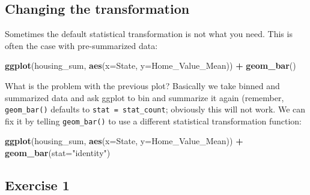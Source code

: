 \documentclass[]{book}
\newenvironment{Shaded}{\begin{snugshade}}{\end{snugshade}}
\newcommand{\KeywordTok}[1]{\textcolor[rgb]{0.13,0.29,0.53}{\textbf{#1}}}
\newcommand{\DataTypeTok}[1]{\textcolor[rgb]{0.13,0.29,0.53}{#1}}
\newcommand{\StringTok}[1]{\textcolor[rgb]{0.31,0.60,0.02}{#1}}
\newcommand{\OperatorTok}[1]{\textcolor[rgb]{0.81,0.36,0.00}{\textbf{#1}}}
\newcommand{\NormalTok}[1]{#1}
\begin{document}
\subsection{Changing the
transformation}\label{changing-the-transformation}

Sometimes the default statistical transformation is not what you need.
This is often the case with pre-summarized data:

\begin{Shaded}
\end{Shaded}

\begin{Shaded}
\begin{Highlighting}[]
\KeywordTok{ggplot}\NormalTok{(housing_sum, }\KeywordTok{aes}\NormalTok{(}\DataTypeTok{x=}\NormalTok{State, }\DataTypeTok{y=}\NormalTok{Home_Value_Mean)) }\OperatorTok{+}\StringTok{ }
\StringTok{  }\KeywordTok{geom_bar}\NormalTok{()}
\end{Highlighting}
\end{Shaded}

What is the problem with the previous plot? Basically we take binned and
summarized data and ask ggplot to bin and summarize it again (remember,
\texttt{geom\_bar()} defaults to \texttt{stat\ =\ stat\_count};
obviously this will not work. We can fix it by telling
\texttt{geom\_bar()} to use a different statistical transformation
function:

\begin{Shaded}
\begin{Highlighting}[]
\KeywordTok{ggplot}\NormalTok{(housing_sum, }\KeywordTok{aes}\NormalTok{(}\DataTypeTok{x=}\NormalTok{State, }\DataTypeTok{y=}\NormalTok{Home_Value_Mean)) }\OperatorTok{+}\StringTok{ }
\StringTok{  }\KeywordTok{geom_bar}\NormalTok{(}\DataTypeTok{stat=}\StringTok{"identity"}\NormalTok{)}
\end{Highlighting}
\end{Shaded}

\subsection{Exercise 1}\label{exercise-1-2}
\end{document}
